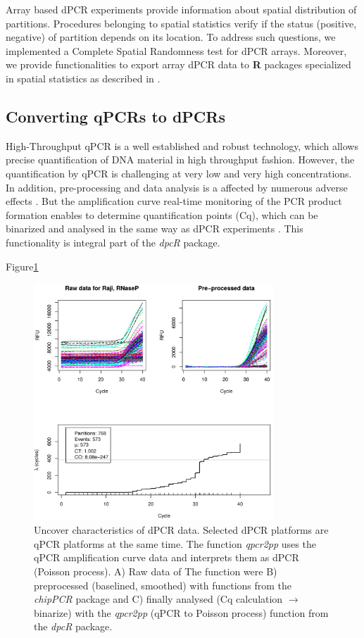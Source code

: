 \documentclass[a4,center,fleqn]{NAR}
\begin{document}
Array based dPCR experiments provide information about spatial distribution of 
partitions. Procedures belonging to spatial statistics verify if the status 
(positive, negative) of partition depends on its location. To address such 
questions, we implemented a Complete Spatial Randomness test for dPCR arrays. 
Moreover, we provide functionalities to export array dPCR data to \textbf{R} 
packages specialized in spatial statistics as described in 
\cite{Baddeley_2015}.

\subsection{Converting qPCRs to dPCRs}

High-Throughput qPCR is a well established and robust technology, which allows 
precise quantification of DNA material in high throughput fashion. However, the 
quantification by qPCR is challenging at very low and very high concentrations. 
In addition, pre-processing and data analysis is a affected by numerous adverse 
effects \cite{ruijter_2013, pabinger_survey_2014, spiess_impact_2015}. But the 
amplification curve real-time monitoring of the PCR product formation enables 
to 
determine quantification points (Cq), which can be binarized and analysed in 
the 
same way as dPCR experiments \cite{mojtahedi_2014}. This functionality is 
integral part of the \textit{dpcR} package.

Figure\ref{qpcr2pp_1}

\begin{figure}[t]
\begin{center}
\includegraphics[width=9cm]{qpcr2pp_1.png}
\end{center}
\caption{Uncover characteristics of dPCR data. Selected dPCR platforms are qPCR 
platforms at the same time. The function \textit{qpcr2pp} uses the qPCR 
amplification curve data and interprets them as dPCR (Poisson process). A) Raw 
data of The function were B) preprocessed (baselined, smoothed) with functions 
from the \textit{chipPCR} package and C) finally analysed (Cq calculation 
$\rightarrow$ binarize) with the \textit{qpcr2pp} (qPCR to Poisson process) 
function from the \textit{dpcR} package.} 
\label{qpcr2pp_1}
\end{figure}
\end{document}
